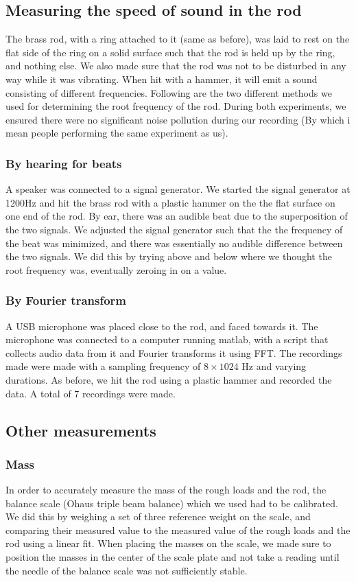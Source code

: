 \documentclass[11pt,a4paper]{article}
\begin{document}
  \subsection{Measuring the speed of sound in the rod}
      The brass rod, with a ring attached to it (same as before), was laid to rest on the flat side of the ring on a solid surface such that the rod is held up by the ring, and nothing else. We also made sure that the rod was not to be disturbed in any way while it was vibrating. When hit with a hammer, it will emit a sound consisting of different frequencies. Following are the two different methods we used for determining the root frequency of the rod.
      During both experiments, we ensured there were no significant noise pollution during our recording (By which i mean people performing the same experiment as us).
      \subsubsection{By hearing for beats}
        A speaker was connected to a signal generator. We started the signal generator at 1200Hz and hit the brass rod with a plastic hammer on the the flat surface on one end of the rod. By ear, there was an audible beat due to the superposition of the two signals. We adjusted the signal generator such that the the frequency of the beat was minimized, and there was essentially no audible difference between the two signals. We did this by trying above and below where we thought the root frequency was, eventually zeroing in on a value.

      \subsubsection{By Fourier transform}
        A USB microphone was placed close to the rod, and faced towards it. The microphone was connected to a computer running matlab, with a script that collects audio data from it and Fourier transforms it using FFT. The recordings made were made with a sampling frequency of $8\times1024$ Hz and varying durations. As before, we hit the rod using a plastic hammer and recorded the data. A total of 7 recordings were made.

      \subsection{Other measurements}
        \subsubsection{Mass}
          In order to accurately measure the mass of the rough loads and the rod, the balance scale (Ohaus triple beam balance) which we used had to be calibrated. We did this by weighing a set of three reference weight on the scale, and comparing their measured value to the measured value of the rough loads and the rod using a linear fit. When placing the masses on the scale, we made sure to position the masses in the center of the scale plate and not take a reading until the needle of the balance scale was not sufficiently stable.
\end{document}
